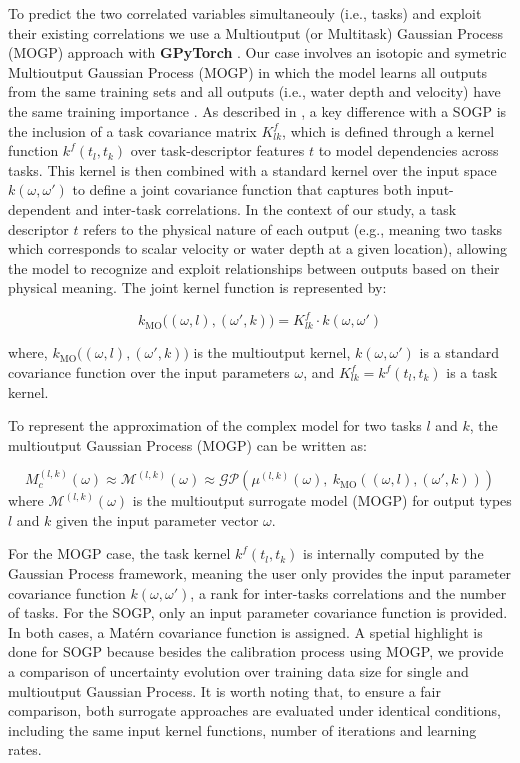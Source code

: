 \documentclass[draft,linenumbers,onecolumn]{agujournal2019} %
\begin{document}
To predict the two correlated variables simultaneouly (i.e., tasks) and exploit their existing correlations we use a Multioutput (or Multitask) Gaussian Process (MOGP) approach with \textbf{GPyTorch} \cite{gardner2018gpytorch}. Our case involves an isotopic and symetric Multioutput Gaussian Process (MOGP) in which the model learns all outputs from the same training sets and all outputs (i.e., water depth and velocity) have the same training importance \cite{liu2018remarks}. As described in , a key difference with a SOGP is the inclusion of a task covariance matrix \( K_{lk}^{f} \), which is defined through a kernel function \( k^{f}{(t_l, t_k)} \) over task-descriptor features \( t \) to model dependencies across tasks. This kernel is then combined with a standard kernel over the input space \(k(\omega, \omega')\) to define a joint covariance function that captures both input-dependent and inter-task correlations. In the context of our study, a task descriptor \( t \) refers to the physical nature of each output (e.g., meaning two tasks which corresponds to scalar velocity or water depth at a given location), allowing the model to recognize and exploit relationships between outputs based on their physical meaning. The joint kernel function is represented by: 

\[
 k_{\text{MO}}\big((\omega, l), (\omega', k)\big) =  K_{lk}^{f} \cdot k(\omega, \omega')
\]

where, \( k_{\text{MO}}\big((\omega, l), (\omega', k)\big) \) is the multioutput kernel, \( k(\omega, \omega') \) is a standard covariance function over the input parameters \( \omega \), and  \( K_{lk}^{f} = k^{f}{(t_l, t_k)} \) is a task kernel.

To represent the approximation of the complex model for two tasks \( l \) and \( k \), the multioutput Gaussian Process (MOGP) can be written as:

\[
M_c^{(l,k)}(\omega) \approx \mathcal{M}^{(l,k)}(\omega) \approx \mathcal{GP}\left(\mu^{(l,k)}(\omega),\ k_{\text{MO}}\left((\omega, l), (\omega', k)\right)\right)
\]
where \( \mathcal{M}^{(l,k)}(\omega) \) is the multioutput surrogate model (MOGP) for output types \( l \) and \( k \) given the input parameter vector \( \omega \).


For the MOGP case, the task kernel \( k^{f}{(t_l, t_k)} \) is internally computed by the Gaussian Process framework, meaning the user only provides the input parameter covariance function \( k(\omega, \omega') \), a rank for inter-tasks correlations and the number of tasks. For the SOGP, only an input parameter covariance function is provided. In both cases, a Matérn covariance function is assigned. A spetial highlight is done for SOGP because besides the calibration process using MOGP, we provide a comparison of uncertainty evolution over training data size for single and multioutput Gaussian Process. It is worth noting that, to ensure a fair comparison, both surrogate approaches are evaluated under identical conditions, including the same input kernel functions, number of iterations and learning rates.
\end{document}
